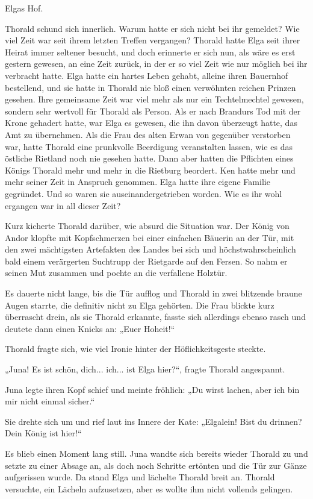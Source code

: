 Elgas Hof.

Thorald schund sich innerlich. Warum hatte er sich nicht bei ihr gemeldet? Wie viel Zeit war seit ihrem letzten Treffen vergangen? Thorald hatte Elga seit ihrer Heirat immer seltener besucht, und doch erinnerte er sich nun, als wäre es erst gestern gewesen, an eine Zeit zurück, in der er so viel Zeit wie nur möglich bei ihr verbracht hatte. Elga hatte ein hartes Leben gehabt, alleine ihren Bauernhof bestellend, und sie hatte in Thorald nie bloß einen verwöhnten reichen Prinzen gesehen. Ihre gemeinsame Zeit war viel mehr als nur ein Techtelmechtel gewesen, sondern sehr wertvoll für Thorald als Person. Als er nach Brandurs Tod mit der Krone gehadert hatte, war Elga es gewesen, die ihn davon überzeugt hatte, das Amt zu übernehmen. Als die Frau des alten Erwan von gegenüber verstorben war, hatte Thorald eine prunkvolle Beerdigung veranstalten lassen, wie es das östliche Rietland noch nie gesehen hatte. Dann aber hatten die Pflichten eines Königs Thorald mehr und mehr in die Rietburg beordert. Ken hatte mehr und mehr seiner Zeit in Anspruch genommen. Elga hatte ihre eigene Familie gegründet. Und so waren sie auseinandergetrieben worden. Wie es ihr wohl ergangen war in all dieser Zeit?

Kurz kicherte Thorald darüber, wie absurd die Situation war. Der König von Andor klopfte mit Kopfschmerzen bei einer einfachen Bäuerin an der Tür, mit den zwei mächtigsten Artefakten des Landes bei sich und höchstwahrscheinlich bald einem verärgerten Suchtrupp der Rietgarde auf den Fersen. So nahm er seinen Mut zusammen und pochte an die verfallene Holztür.

Es dauerte nicht lange, bis die Tür aufflog und Thorald in zwei blitzende braune Augen starrte, die definitiv nicht zu Elga gehörten. Die Frau blickte kurz überrascht drein, als sie Thorald erkannte, fasste sich allerdings ebenso rasch und deutete dann einen Knicks an: „Euer Hoheit!“

Thorald fragte sich, wie viel Ironie hinter der Höflichkeitsgeste steckte.

„Juna! Es ist schön, dich... ich... ist Elga hier?“, fragte Thorald angespannt.

Juna legte ihren Kopf schief und meinte fröhlich: „Du wirst lachen, aber ich bin mir nicht einmal sicher.“

Sie drehte sich um und rief laut ins Innere der Kate: „Elgalein! Bist du drinnen? Dein König ist hier!“

Es blieb einen Moment lang still. Juna wandte sich bereits wieder Thorald zu und setzte zu einer Absage an, als doch noch Schritte ertönten und die Tür zur Gänze aufgerissen wurde. Da stand Elga und lächelte Thorald breit an. Thorald versuchte, ein Lächeln aufzusetzen, aber es wollte ihm nicht vollends gelingen.

